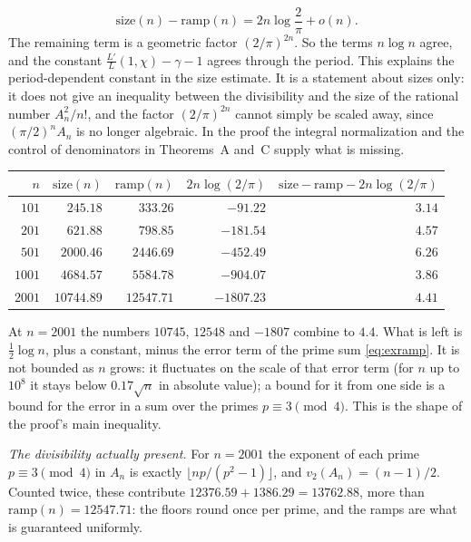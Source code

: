 \documentclass[11pt]{amsart}
\numberwithin{equation}{section}
\theoremstyle{definition}
\theoremstyle{remark}
\begin{document}
\begin{equation}\label{eq:exmatch}
 \mathrm{size}(n)-\mathrm{ramp}(n)=2n\log\frac2\pi+o(n).
\end{equation}
The remaining term is a geometric factor $(2/\pi)^{2n}$. So the terms $n\log n$ agree, and the constant $\frac{L'}L(1,\chi)-\gamma-1$ agrees through the period. This explains the period-dependent constant in the size estimate. It is a statement about sizes only: it does not give an inequality between the divisibility and the size of the rational number $A_n^2/n!$, and the factor $(2/\pi)^{2n}$ cannot simply be scaled away, since $(\pi/2)^nA_n$ is no longer algebraic. In the proof the integral normalization and the control of denominators in Theorems~A and~C supply what is missing.
\begin{center}\small
\begin{tabular}{@{}rrrrr@{}}
\toprule
$n$ & $\mathrm{size}(n)$ & $\mathrm{ramp}(n)$ & $2n\log(2/\pi)$ & $\mathrm{size}-\mathrm{ramp}-2n\log(2/\pi)$\\
\midrule
$101$ & $245.18$ & $333.26$ & $-91.22$ & $3.14$\\
$201$ & $621.88$ & $798.85$ & $-181.54$ & $4.57$\\
$501$ & $2000.46$ & $2446.69$ & $-452.49$ & $6.26$\\
$1001$ & $4684.57$ & $5584.78$ & $-904.07$ & $3.86$\\
$2001$ & $10744.89$ & $12547.71$ & $-1807.23$ & $4.41$\\
\bottomrule
\end{tabular}
\end{center}
At $n=2001$ the numbers $10745$, $12548$ and $-1807$ combine to $4.4$. What is left is $\frac12\log n$, plus a constant, minus the error term of the prime sum \eqref{eq:exramp}. It is not bounded as $n$ grows: it fluctuates on the scale of that error term (for $n$ up to $10^8$ it stays below $0.17\sqrt n$ in absolute value); a bound for it from one side is a bound for the error in a sum over the primes $p\equiv3\pmod4$. This is the shape of the proof's main inequality.

\emph{The divisibility actually present.} For $n=2001$ the exponent of each prime $p\equiv3\pmod4$ in $A_n$ is exactly $\lfloor np/(p^2-1)\rfloor$, and $v_2(A_n)=(n-1)/2$. Counted twice, these contribute $12376.59+1386.29=13762.88$, more than $\mathrm{ramp}(n)=12547.71$: the floors round once per prime, and the ramps are what is guaranteed uniformly.
\end{document}
